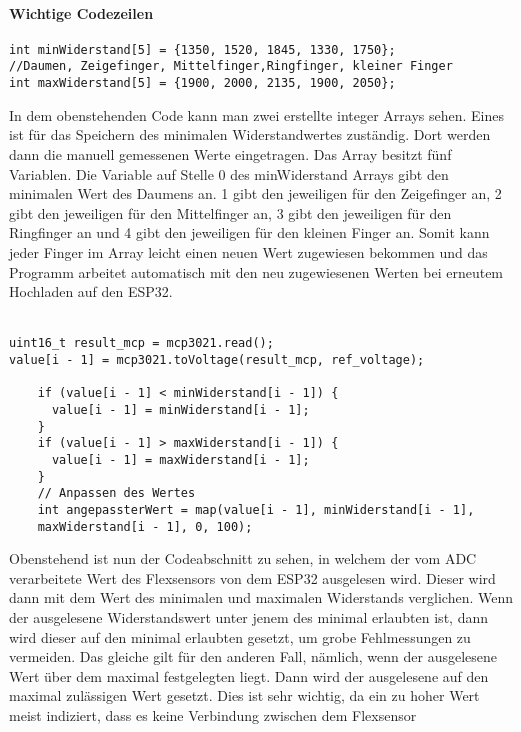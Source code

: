 \documentclass[titlepage,12pt,twoside]{article}
\begin{document}
\paragraph{Wichtige Codezeilen}
\hfill \break
\hfill \break
\begin{lstlisting}
int minWiderstand[5] = {1350, 1520, 1845, 1330, 1750};  
//Daumen, Zeigefinger, Mittelfinger,Ringfinger, kleiner Finger
int maxWiderstand[5] = {1900, 2000, 2135, 1900, 2050};
\end{lstlisting}
\hfill \break
In dem obenstehenden Code kann man zwei erstellte integer Arrays sehen. Eines ist 
für das Speichern des minimalen Widerstandwertes zuständig. Dort werden dann die 
manuell gemessenen Werte eingetragen. Das Array besitzt fünf Variablen. Die Variable 
auf Stelle 0 des minWiderstand Arrays gibt den minimalen Wert des Daumens an. 1 gibt 
den jeweiligen für den Zeigefinger an, 2 gibt den jeweiligen für den Mittelfinger an, 
3 gibt den jeweiligen für den Ringfinger an und 4 gibt den jeweiligen für den 
kleinen Finger an. Somit kann jeder Finger im Array leicht einen neuen Wert 
zugewiesen bekommen und das Programm arbeitet automatisch mit den neu zugewiesenen 
Werten bei erneutem Hochladen auf den ESP32. \\
\\
\begin{lstlisting}
uint16_t result_mcp = mcp3021.read();
value[i - 1] = mcp3021.toVoltage(result_mcp, ref_voltage);

    if (value[i - 1] < minWiderstand[i - 1]) {
      value[i - 1] = minWiderstand[i - 1];
    }
    if (value[i - 1] > maxWiderstand[i - 1]) {
      value[i - 1] = maxWiderstand[i - 1];
    }
    // Anpassen des Wertes
    int angepassterWert = map(value[i - 1], minWiderstand[i - 1],
	maxWiderstand[i - 1], 0, 100);

\end{lstlisting}
\hfill \break
Obenstehend ist nun der Codeabschnitt zu sehen, in welchem der vom ADC verarbeitete 
Wert des Flexsensors von dem ESP32 ausgelesen wird. Dieser wird dann mit dem Wert 
des minimalen und maximalen Widerstands verglichen. Wenn der ausgelesene Widerstandswert 
unter jenem des minimal erlaubten ist, dann wird dieser auf den minimal erlaubten 
gesetzt, um grobe Fehlmessungen zu vermeiden. Das gleiche gilt für den anderen Fall, 
nämlich, wenn der ausgelesene Wert über dem maximal festgelegten liegt. Dann wird 
der ausgelesene auf den maximal zulässigen Wert gesetzt. Dies ist sehr wichtig, da 
ein zu hoher Wert meist indiziert, dass es keine Verbindung zwischen dem Flexsensor 
\end{document}
